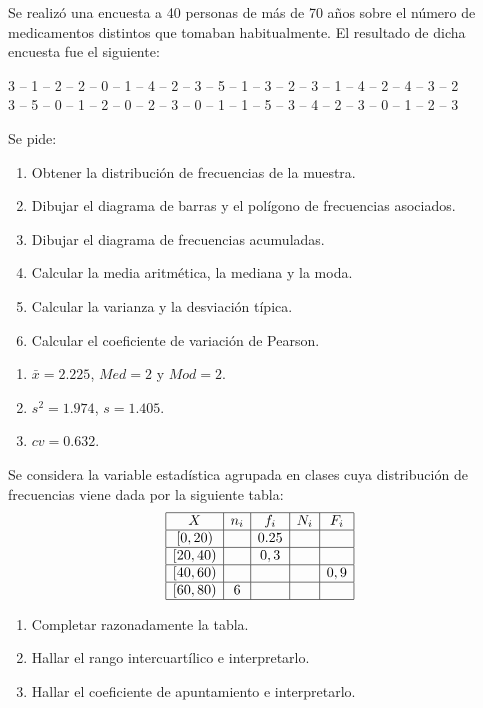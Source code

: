 {Se realizó una encuesta a 40 personas de más de 70 años sobre el número de medicamentos distintos que tomaban habitualmente.
El resultado de dicha encuesta fue el siguiente:
\begin{center}
3 -- 1 -- 2 -- 2 -- 0 -- 1 -- 4 -- 2 -- 3 -- 5 -- 1 -- 3 -- 2 -- 3 -- 1 -- 4 -- 2 -- 4 -- 3 -- 2 \\
3 -- 5 -- 0 -- 1 -- 2 -- 0 -- 2 -- 3 -- 0 -- 1 -- 1 -- 5 -- 3 -- 4 -- 2 -- 3 -- 0 -- 1 -- 2 -- 3
\end{center}
Se pide:
\begin{enumerate}
\item Obtener la distribución de frecuencias de la muestra.
\item Dibujar el diagrama de barras y el polígono de frecuencias asociados.
\item Dibujar el diagrama de frecuencias acumuladas.
\item Calcular la media aritmética, la mediana y la moda.
\item Calcular la varianza y la desviación típica.
\item Calcular el coeficiente de variación de Pearson.
\end{enumerate}
}
{\begin{enumerate}[start=4]
\item $ \bar{x} = 2.225$, $Med =2$ y $Mod= 2$.
\item $s^2 = 1.974$, $s= 1.405$.
\item $cv = 0.632$.
\end{enumerate}
}
{}


{Se considera la variable estadística agrupada en clases cuya distribución de frecuencias viene dada por la siguiente tabla:
\[
\begin{array}{|c|c|c|c|c|}
\hline
X & n_i & f_i & N_i & F_i\\
\hline
[0,20) & & 0.25 & &  \\
\hline
[20,40) & & 0,3 & & \\
\hline
[40,60) &  &  & &  0,9\\
\hline
[60,80) & 6 & & & \\
\hline
\end{array}
\]

\begin{enumerate}
\item Completar razonadamente la tabla.
\item Hallar el rango intercuartílico e interpretarlo.
\item Hallar el coeficiente de apuntamiento e interpretarlo.
\end{enumerate}
}



